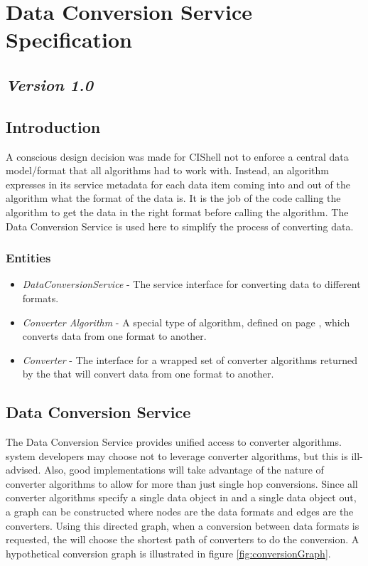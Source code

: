 \chapter{Data Conversion Service Specification}
\section*{\textit{Version 1.0}}
\section{Introduction}

A conscious design decision was made for CIShell not to enforce a central data
model/format that all algorithms had to work with. Instead, an algorithm
expresses in its service metadata for each data item coming into and out of the
algorithm what the format of the data is. It is the job of the code calling the
algorithm to get the data in the right format before calling the algorithm. The
Data Conversion Service is used here to simplify the process of converting data.

\subsection{Entities}

\begin{itemize}
  \item \textit{DataConversionService} - The service interface for converting
  data to different formats.
  \item \textit{Converter Algorithm} - A special type of algorithm, defined
  on page \pageref{converterAlg}, which converts data from one format to
  another.
  \item \textit{Converter} - The interface for a wrapped set of converter
  algorithms returned by the  that will convert
  data from one format to another.
\end{itemize}

\section{Data Conversion Service}

The Data Conversion Service provides unified access to converter algorithms.
 system developers may choose not to leverage
converter algorithms, but this is ill-advised. Also, good implementations will
take advantage of the nature of converter algorithms to allow for more than just
single hop conversions. Since all converter algorithms specify a single data
object in and a single data object out, a graph can be constructed where nodes
are the data formats and edges are the converters. Using this directed graph,
when a conversion between data formats is requested, the
 will choose the shortest path of converters to do
the conversion. A hypothetical conversion graph is illustrated in figure
\ref{fig:conversionGraph}.

